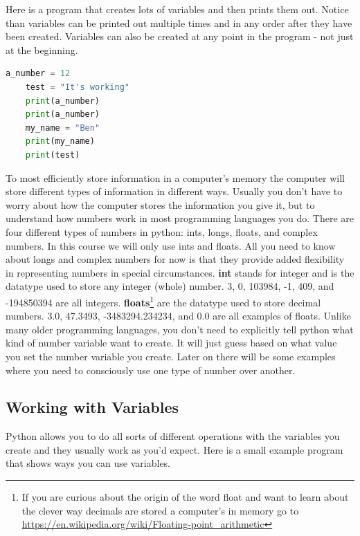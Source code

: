 \documentclass[]{article}
\begin{document}
Here is a program that creates lots of variables and then prints them out.  Notice than variables can be printed out multiple times and in any order after they have been created. Variables can also be created at any point in the program - not just at the beginning.

\begin{lstlisting}[language=Python]
    a_number = 12
    test = "It's working"
    print(a_number)
    print(a_number)
    my_name = "Ben"
    print(my_name)
    print(test)
\end{lstlisting}

To most efficiently store information in a computer's memory the computer will store different types of information in different ways.  Usually you don't have to worry about how the computer stores the information you give it, but to understand how numbers work in most programming languages you do. There are four different types of numbers in python: ints, longs, floats, and complex numbers. In this course we will only use ints and floats.  All you need to know about longs and complex numbers for now is that they provide added flexibility in representing numbers in special circumstances.  \textbf{int} stands for integer and is the datatype used to store any integer (whole) number.  3, 0, 103984, -1, 409, and -194850394 are all integers.  \textbf{floats}\footnote{If you are curious about the origin of the word float and want to learn about the clever way decimals are stored a computer's in memory go to \url{https://en.wikipedia.org/wiki/Floating-point_arithmetic}} are the datatype used to store decimal numbers.  3.0, 47.3493, -3483294.234234, and 0.0 are all examples of floats.  Unlike many older programming languages, you don't need to explicitly tell python what kind of number variable want to create.  It will just guess based on what value you set the number variable you create. Later on there will be some examples where you need to consciously use one type of number over another.

\subsection{ Working with Variables }

Python allows you to do all sorts of different operations with the variables you create and they usually work as you'd expect.  Here is a small example program that shows ways you can use variables.
\end{document}
